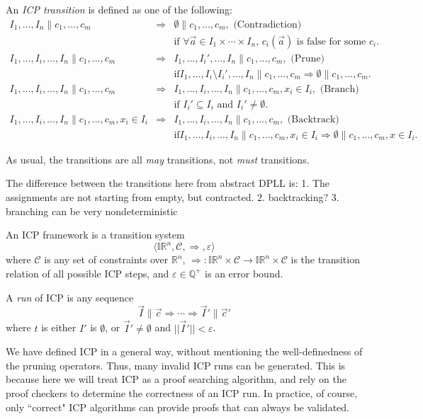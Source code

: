 \documentclass[envcountsect]{llncs}
\begin{document}
\begin{definition}
An {\em ICP transition} is defined as one of the following:
\begin{eqnarray*}
I_1,...,I_n \parallel c_1, ..., c_m &\Longrightarrow&  \emptyset\parallel
c_1,...,c_m,
\mbox{ (Contradiction) }\\ & &\mbox{if $\forall \vec a\in
I_1\times\cdots\times I_n$, $c_i(\vec a)$ is false for some $c_i$.}\\
I_1,...,I_i,...,I_n \parallel c_1,...,c_m &\Longrightarrow&
I_1,...,I_i',...,I_n\parallel c_1,...,c_m, \mbox{ (Prune) }\\& & \mbox{if
$I_1,...,I_i\setminus I_i',...,I_n\parallel c_1,...,c_m\Longrightarrow
\emptyset \parallel c_1,...,c_m$.}\\
I_1,...,I_i,...,I_n \parallel c_1,...,c_m &\Longrightarrow&
I_1,...,I_i,...,I_n \parallel c_1,...,c_m, x_i\in I_i, \mbox{ (Branch) }\\&
&\mbox{if $I_i'\subseteq I_i$ and $I_i' \neq \emptyset$.}\\
I_1,...,I_i,...,I_n \parallel c_1,...,c_m, x_i\in I_i &\Longrightarrow&
I_1,...,I_i,...,I_n \parallel c_1,...,c_m,\mbox{ (Backtrack) }\\& & \mbox{if
$I_1,...,I_i,...,I_n\parallel c_1,...,c_m, x_i\in I_i \Longrightarrow
\emptyset\parallel c_1,...,c_m, x\in I_i$.}
\end{eqnarray*}
\end{definition}
As usual, the transitions are all {\em may} transitions, not {\em must}
transitions. 
\begin{remark}
The difference between the transitions here from abstract DPLL is:
1. The assignments are not starting from empty, but contracted.
2. backtracking? 
3. branching can be very nondeterministic
\end{remark}
\begin{definition}
An ICP framework is a transition system 
$$\langle \mathbb{IR}^n, \mathcal{C}, \Longrightarrow, \varepsilon\rangle$$
where $\mathcal{C}$ is any set of constraints over $\mathbb{R}^n$,
$\Longrightarrow: \mathbb{IR}^n\times
\mathcal{C}\rightarrow \mathbb{IR}^n\times \mathcal{C}$ is the transition
relation of all possible ICP steps, and $\varepsilon\in \mathbb{Q}^+$ is an
error bound. 

A {\em run} of ICP is any sequence
$$\vec I \parallel \vec c \Longrightarrow \cdots \Longrightarrow \vec
I'\parallel \vec c'$$
where $t$ is either $I'$ is $\emptyset$, or $\vec I'\neq \emptyset$ and $||\vec
I'||<\varepsilon$.
\end{definition}
\begin{remark}
We have defined ICP in a general way, without mentioning the well-definedness of
the pruning operators. Thus, many invalid ICP runs can be generated. This is
because here we will treat ICP as a proof searching algorithm, and rely on the
proof checkers to determine the correctness of an ICP run. In practice, of
course, only
``correct" ICP algorithms can provide proofs that can always be validated.    
\end{remark}
\end{document}
